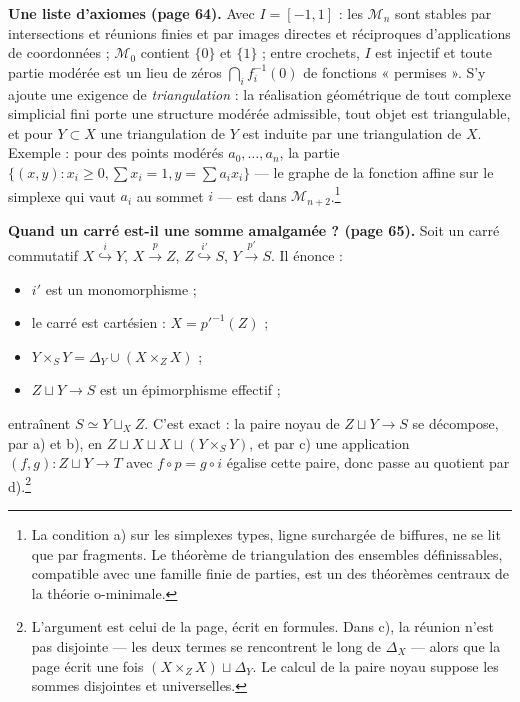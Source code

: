 \documentclass[11pt,a4paper]{article}
\begin{document}
\textbf{Une liste d'axiomes (page 64).} Avec $I = [-1, 1]$ : les
$\mathcal{M}_n$ sont stables par intersections et réunions finies et par images
directes et réciproques d'applications de coordonnées ; $\mathcal{M}_0$
contient $\{0\}$ et $\{1\}$ ; entre crochets, $I$ est injectif et toute partie
modérée est un lieu de zéros $\bigcap_i f_i^{-1}(0)$ de fonctions « permises ».
S'y ajoute une exigence de \emph{triangulation} : la réalisation géométrique de
tout complexe simplicial fini porte une structure modérée admissible, tout objet
est triangulable, et pour $Y \subset X$ une triangulation de $Y$ est induite
par une triangulation de $X$. Exemple : pour des points modérés $a_0, \dots,
a_n$, la partie $\{ (x, y) : x_i \geqslant 0, \sum x_i = 1, y = \sum a_i x_i
\}$ — le graphe de la fonction affine sur le simplexe qui vaut $a_i$ au sommet
$i$ — est dans $\mathcal{M}_{n+2}$.\footnote{La condition a) sur les simplexes
types, ligne surchargée de biffures, ne se lit que par fragments. Le
théorème de triangulation des ensembles définissables, compatible avec une
famille finie de parties, est un des théorèmes centraux de la théorie
o-minimale.}

\textbf{Quand un carré est-il une somme amalgamée ? (page 65).} Soit un carré
commutatif $X \overset{i}{\hookrightarrow} Y$, $X \xrightarrow{p} Z$, $Z
\overset{i'}{\hookrightarrow} S$, $Y \xrightarrow{p'} S$. Il énonce :

\begin{itemize}
\item[a)] $i'$ est un monomorphisme ;
\item[b)] le carré est cartésien : $X = p'^{-1}(Z)$ ;
\item[c)] $Y \times_S Y = \Delta_Y \cup (X \times_Z X)$ ;
\item[d)] $Z \sqcup Y \to S$ est un épimorphisme effectif ;
\end{itemize}

entraînent $S \simeq Y \sqcup_X Z$. C'est exact : la paire noyau de
$Z \sqcup Y \to S$ se décompose, par a) et b), en $Z \sqcup X \sqcup X \sqcup
(Y \times_S Y)$, et par c) une application $(f, g) : Z \sqcup Y \to T$ avec
$f \circ p = g \circ i$ égalise cette paire, donc passe au quotient par
d).\footnote{L'argument est celui de la page, écrit en formules. Dans c), la
réunion n'est pas disjointe — les deux termes se rencontrent le long de
$\Delta_X$ — alors que la page écrit une fois $(X \times_Z X) \sqcup \Delta_Y$.
Le calcul de la paire noyau suppose les sommes disjointes et universelles.}
\end{document}
